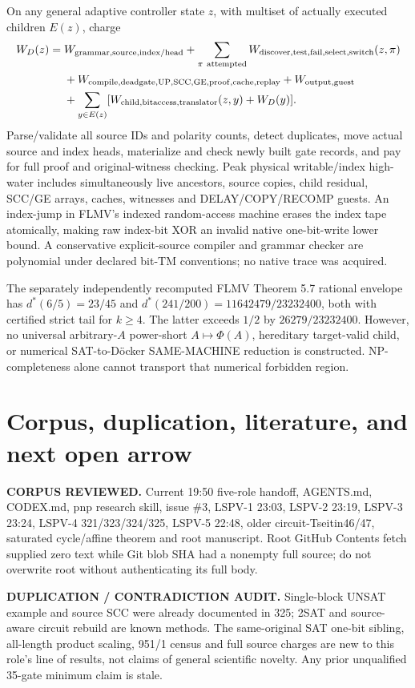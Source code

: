 \documentclass[11pt]{article}
\begin{document}
On any general adaptive controller state $z$, with multiset
of actually executed children $E(z)$, charge
\[
\begin{split}
W_D(z)={}&W_{\rm grammar,source,index/head}+
\sum_{\pi\ {\rm attempted}}W_{\rm discover,test,fail,select,switch}(z,\pi)\\
&+W_{\rm compile,deadgate,UP,SCC,GE,proof,cache,replay}
+W_{\rm output,guest}\\
&+\sum_{y\in E(z)}
[W_{\rm child,bitaccess,translator}(z,y)+W_D(y)].
\end{split}
\]
Parse/validate all source IDs and polarity counts, detect
duplicates, move actual source and index heads, materialize
and check newly built gate records, and pay for full proof
and original-witness checking. Peak physical writable/index
high-water includes simultaneously live ancestors, source
copies, child residual, SCC/GE arrays, caches, witnesses
and DELAY/COPY/RECOMP guests. An index-jump in FLMV's
indexed random-access machine erases the index tape
atomically, making raw index-bit XOR an invalid native
one-bit-write lower bound. A conservative explicit-source
compiler and grammar checker are polynomial under
declared bit-TM conventions; no native trace was acquired.

The separately independently recomputed
FLMV Theorem 5.7 rational envelope has
$d^*(6/5)=23/45$ and
$d^*(241/200)=11642479/23232400$,
both with certified strict tail for $k\ge4$.
The latter exceeds $1/2$ by $26279/23232400$.
However, no universal arbitrary-$A$ power-short
$A\mapsto\Phi(A)$, hereditary target-valid child,
or numerical SAT-to-D\"ocker SAME-MACHINE reduction
is constructed. NP-completeness alone cannot transport
that numerical forbidden region.\cite{flmv2005}

\section{Corpus, duplication, literature, and next open arrow}
\noindent\textbf{CORPUS REVIEWED.}
Current 19:50 five-role handoff, AGENTS.md, CODEX.md,
pnp research skill, issue \#3, LSPV-1 23:03,
LSPV-2 23:19, LSPV-3 23:24, LSPV-4 321/323/324/325,
LSPV-5 22:48, older circuit-Tseitin46/47, saturated
cycle/affine theorem and root manuscript.
Root GitHub Contents fetch supplied zero text while
Git blob SHA had a nonempty full source; do not overwrite
root without authenticating its full body.

\noindent\textbf{DUPLICATION / CONTRADICTION AUDIT.}
Single-block UNSAT example and source SCC were already
documented in 325; 2SAT and source-aware circuit rebuild
are known methods. The same-original SAT one-bit sibling,
all-length product scaling, 951/1 census and full source
charges are new to this role's line of results, not
claims of general scientific novelty.
Any prior unqualified 35-gate minimum claim is stale.
\end{document}
